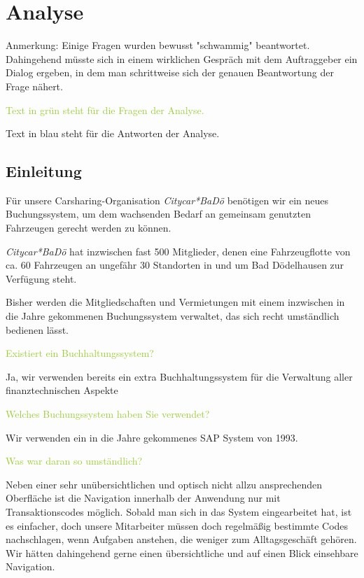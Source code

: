 \chapter{Analyse}

Anmerkung: Einige Fragen wurden bewusst "schwammig" beantwortet. Dahingehend müsste sich in einem wirklichen Gespräch mit dem Auftraggeber ein Dialog ergeben, in dem man schrittweise sich der genauen Beantwortung der Frage nähert. 

\textcolor{YellowGreen}{Text in grün steht für die Fragen der Analyse.}

\textcolor{NavyBlue}{Text in blau steht für die Antworten der Analyse.}

\section{Einleitung}

Für unsere Carsharing-Organisation \emph{Citycar*BaDö} benötigen wir ein neues Buchungssystem, um dem wachsenden Bedarf an gemeinsam genutzten Fahrzeugen gerecht werden zu können. 

\emph{Citycar*BaDö} hat inzwischen fast 500 Mitglieder, denen eine Fahrzeugflotte von ca. 60 Fahrzeugen an ungefähr 30 Standorten in und um Bad Dödelhausen zur Verfügung steht. 

Bisher werden die Mitgliedschaften und Vermietungen mit einem inzwischen in die Jahre gekommenen Buchungssystem verwaltet, das sich recht umständlich bedienen lässt. 

\textcolor{YellowGreen}{Existiert ein Buchhaltungssystem?}

\textcolor{NavyBlue}{Ja, wir verwenden bereits ein extra Buchhaltungssystem für die Verwaltung aller finanztechnischen Aspekte}

\textcolor{YellowGreen}{Welches Buchungssystem haben Sie verwendet?}

\textcolor{NavyBlue}{Wir verwenden ein in die Jahre gekommenes SAP System von 1993.}

\textcolor{YellowGreen}{Was war daran so umständlich?}

\textcolor{NavyBlue}{Neben einer sehr unübersichtlichen und optisch nicht allzu ansprechenden Oberfläche ist die Navigation innerhalb der Anwendung nur mit Transaktionscodes möglich. Sobald man sich in das System eingearbeitet hat, ist es einfacher, doch unsere Mitarbeiter müssen doch regelmäßig bestimmte Codes nachschlagen, wenn Aufgaben anstehen, die weniger zum Alltagsgeschäft gehören. Wir hätten dahingehend gerne einen übersichtliche und auf einen Blick einsehbare Navigation.}

